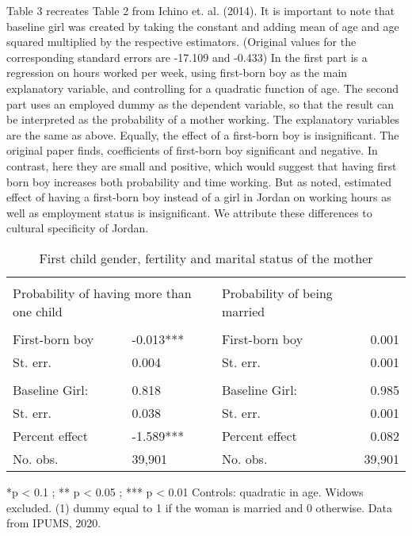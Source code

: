 \documentclass[12pt,draft,a4paper]{article}
\begin{document}
Table 3 recreates Table 2 from Ichino et. al. (2014). It is important to note that baseline girl was created by taking the constant and adding mean of age and age squared multiplied by the respective estimators. 
(Original values for the corresponding standard errors are -17.109 and -0.433) In the first part is a regression on hours worked per week, using first-born boy as the main explanatory variable, and controlling for a quadratic function of age. 
The second part uses an employed dummy as the dependent variable, so that the result can be interpreted as the probability of a mother working. 
The explanatory variables are the same as above. Equally, the effect of a first-born boy is insignificant.
The original paper finds, coefficients of first-born boy significant and negative. In contrast, here they are small and positive, which would suggest that having first born boy increases both probability and time working. 
But as noted, estimated effect of having a first-born boy instead of a girl in Jordan on working hours as well as employment status is insignificant. We attribute these differences to cultural specificity of Jordan.
    

\begin{table}[ht]%
    \caption{First child gender, fertility and marital status of the mother}

    
    \begin{tabularx}{\textwidth}{lXlr}
    
    \hline & \\[-1.0em]
    \multicolumn{2}{l}{Probability of having more than one child}  & Probability of being married &  \\
    \hline & \\[-1.0em]
        First-born boy & -0.013***  & First-born boy  & 0.001   \\
        St. err.       & 0.004      & St. err.        & 0.001   \\
        \\[-1.0em]                                                     
        Baseline Girl: & 0.818      & Baseline Girl:  & 0.985   \\
        St. err.       & 0.038      & St. err.        & 0.001   \\
        Percent effect & -1.589***  & Percent effect  & 0.082   \\
        No. obs.       & 39,901     & No. obs.        & 39,901 \\
    \hline
    \end{tabularx}

    *p < 0.1 ; ** p < 0.05 ; *** p < 0.01 Controls: quadratic in age. Widows excluded. (1) dummy equal to 1 if the woman is married and 0 otherwise. Data from IPUMS, 2020.
    \label{tab:fert}
    \end{table}
    
\end{document}
